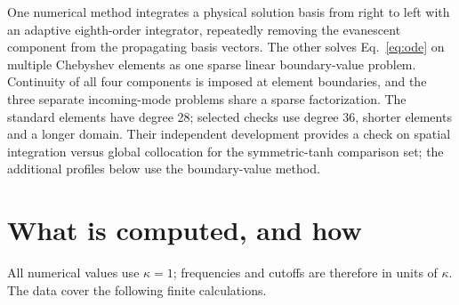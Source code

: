 \documentclass[10pt,a4paper]{article}
\begin{document}
One numerical method integrates a physical solution basis from right to
left with an adaptive eighth-order integrator, repeatedly removing the
evanescent component from the propagating basis vectors. The other
solves Eq.~\eqref{eq:ode} on multiple Chebyshev elements as one sparse
linear boundary-value problem. Continuity of all four components is
imposed at element boundaries, and the three separate incoming-mode
problems share a sparse factorization. The standard elements have degree
28; selected checks use degree 36, shorter elements and a longer domain.
Their independent development
provides a check on spatial integration versus global collocation for
the symmetric-tanh comparison set; the additional profiles below use
the boundary-value method.

\clearpage
\section{What is computed, and how}
\label{sec:computed}
All numerical values use $\kappa=1$; frequencies and cutoffs are therefore
in units of $\kappa$. The data cover the following finite calculations.
\end{document}
